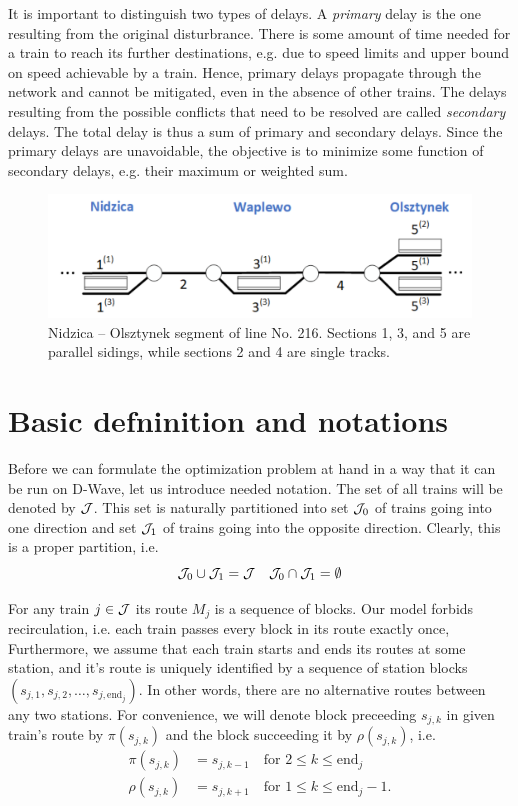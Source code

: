 It is important to distinguish two types of delays. A \emph{primary} delay is the one resulting
from the original disturbrance. There is some amount of time needed for a train to reach its
further destinations, e.g. due to speed limits and upper bound on speed achievable by a train.
Hence, primary delays propagate through the network and cannot be mitigated, even in the absence
of other trains. The delays resulting from the possible conflicts that need to be resolved are
called \emph{secondary} delays. The total delay is thus a sum of primary and secondary delays.
Since the primary delays are unavoidable, the objective is to minimize some function of secondary
delays, e.g. their maximum or weighted sum.

\begin{figure}
    \label{fig:railway-network}
    \includegraphics[width=\textwidth]{figures/line_small.pdf}
    \caption{
        Nidzica -- Olsztynek segment of line No. 216. Sections 1, 3, and 5 are parallel sidings,
        while sections 2 and 4 are single tracks.
    }
\end{figure}

\section{Basic defninition and notations}
Before we can formulate the optimization problem at hand in a way that it can be run on D-Wave,
let us introduce needed notation. The set of all trains will be denoted by $\mathcal{J}$. This set is
naturally partitioned into set $\mathcal{J}_0$ of trains going into one direction and set $\mathcal{J}_1$ of
trains going into the opposite direction. Clearly, this is a proper partition, i.e.
\begin{equation}
    \mathcal{J}_0 \cup \mathcal{J}_1 = \mathcal{J} \quad \mathcal{J}_0 \cap \mathcal{J}_1 = \emptyset
\end{equation}

For any train $j \in \mathcal{J}$ its route $M_j$ is a sequence of blocks. Our model forbids recirculation,
 i.e. each train passes every block in its route exactly once, Furthermore, we assume that each
 train starts and ends its routes at some station, and it's route is uniquely identified by a
 sequence of station blocks
 $\left(s_{j,1}, s_{j, 2}, \ldots, s_{j, \mbox{end}_j}\right)$. In other words, there are no
 alternative routes between any two stations. For convenience, we will denote block preceeding
 $s_{j,k}$ in given train's route by $\pi(s_{j,k})$ and the block succeeding it by $\rho(s_{j,k})$,
 i.e.
 \begin{align}
     \pi(s_{j,k}) &= s_{j,k-1} \quad \mbox{for } 2 \le k \le \mbox{end}_j \\
     \rho(s_{j,k}) &= s_{j,k+1} \quad \mbox{for } 1 \le k \le \mbox{end}_j - 1.
 \end{align}

